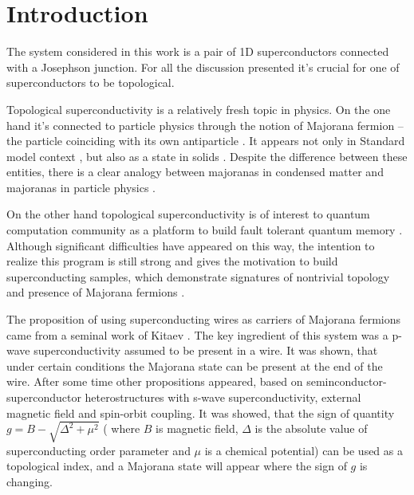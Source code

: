 \chapter{Introduction}


The system considered in this work is a pair of 1D superconductors connected with a Josephson junction. For all the discussion presented it's crucial for one of superconductors to be topological. 

Topological superconductivity is a relatively fresh topic in physics. On the one hand it's connected to particle physics through the notion of Majorana fermion -- the particle coinciding with its own antiparticle \cite{Majorana_1937}. It appears not only in Standard model context 
\cite{particle_majorana_Avignone,
	particle_majorana_Giuliani,
	particle_majorana_Marcocci}
, but also as a state in solids \cite{	majorana_condmat_Rossi,
	majorana_condmat_Kitaev,
	majorana_condmat_Kopnin,
	majorana_condmat_Motrunich,
	majorana_condmat_Nayak,
	majorana_condmat_Read_Green,
	majorana_condmat_Senthil,	majorana_condmat_Volovik,
	majorana_condmat_Fu_Kane,	
	review_majorana_Aguado,	
	review_majorana_Beenakker,
	review_majorana_Oppen}. Despite the difference between these entities, there is a clear analogy between majoranas in condensed matter and majoranas in particle physics \cite{Dirak_BdG_Chamon,Dirak_BdG_Elliott}.

 On the other hand topological superconductivity is of interest to quantum computation community as a platform to build fault tolerant quantum memory \cite{majorana_condmat_Kitaev,quintum_computation_Alicea,quintum_computation_Nayak,quintum_computation_Romito}. Although significant difficulties have appeared on this way, the intention to realize this program is still strong and gives the motivation to build superconducting samples, which demonstrate signatures of nontrivial topology and presence of Majorana fermions \cite{majorana_experiment_Kouwenhoven,majorana_experiment_Vaitiekėnas,majorana_experiment_Zhang}.
 
The proposition of using superconducting wires as carriers of Majorana fermions came from a seminal work of Kitaev \cite{majorana_condmat_Kitaev}. The key ingredient of this system was a p-wave superconductivity assumed to be present in a wire. It was shown, that under certain conditions the Majorana state can be present at the end of the wire. After some time other propositions \cite{Oreg_2010,Lutchyn_2010} appeared, based on seminconductor-superconductor heterostructures with s-wave superconductivity, external magnetic field and spin-orbit coupling. It was showed, that the sign of quantity $ g=B-\sqrt{\Delta^2+\mu^2} $ ( where $ B $ is magnetic field, $ \Delta $ is the absolute value of superconducting order parameter and $ \mu $ is a chemical potential) can be used as a topological index, and a Majorana state will appear where the sign of $g $ is changing.

